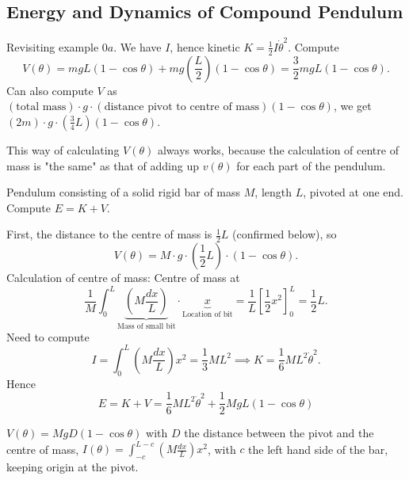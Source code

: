 \documentclass[10pt, a4paper]{article}
\begin{document}
\subsection{Energy and Dynamics of Compound Pendulum}

Revisiting example $0a$.
We have $I$,
hence kinetic $K = \frac{1}{2}I\dot{\theta} ^ 2$.
Compute
\[
V(\theta) = mgL(1 - \cos{\theta}) + mg\left(\frac{L}{2}\right)(1 - \cos{\theta}) = \frac{3}{2}mgL(1 - \cos{\theta}).
\]
Can also compute $V$ as $(\text{total mass}) \cdot g \cdot (\text{distance pivot to centre of mass})(1 - \cos{\theta})$,
we get $(2m)\cdot g\cdot \left(\frac{3}{4}L\right)(1 - \cos{\theta})$.

\begin{remark}
    This way of calculating $V(\theta)$ always works,
    because the calculation of centre of mass is "the same" as that of adding up $v(\theta)$ for each part of the pendulum.
\end{remark}

\begin{example}\label{dyn:exam:examp2}
    Pendulum consisting of a solid rigid bar of mass $M$,
    length $L$,
    pivoted at one end.
    Compute $E = K + V$.

    \begin{solution}
        First,
        the distance to the centre of mass is $\frac{1}{2}L$
        (confirmed below),
        so
        \[
        V(\theta) = M \cdot g \cdot \left(\frac{1}{2}L\right) \cdot (1 - \cos{\theta}).
        \]
        Calculation of centre of mass:
        Centre of mass at
        \[
        \frac{1}{M}\int_{0}^{L}\underbrace{\left(M\frac{dx}{L}\right)}_{\text{Mass of small bit}} \cdot \underbrace{x}_{\text{Location of bit}} = \frac{1}{L}\left[\frac{1}{2}x ^ 2\right]_{0}^{L} = \frac{1}{2}L.
        \]
        Need to compute
        \[
        I = \int_{0}^{L}\left(M\frac{dx}{L}\right)x ^ 2 = \frac{1}{3}ML ^ 2 \implies K = \frac{1}{6}ML ^ 2\dot{\theta} ^ 2.
        \]
        Hence
        \[
        E = K + V = \frac{1}{6}ML ^ 2\dot{\theta} ^ 2 + \frac{1}{2}MgL(1 - \cos{\theta})
        \]
    \end{solution}
\end{example}

$V(\theta) = MgD(1 - \cos{\theta})$ with $D$ the distance between the pivot and the centre of mass,
$I(\theta) = \int_{-c}^{L - c}\left(M\frac{dx}{L}\right)x ^ 2$,
with $c$ the left hand side of the bar,
keeping origin at the pivot.
\end{document}
